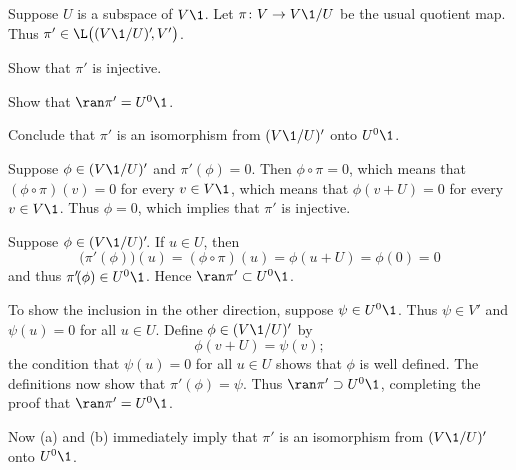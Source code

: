 \exercise
Suppose $U$ is a subspace of $V\1$. Let $\pi \colon V \to V\1/U$ be the usual quotient map. Thus $\pi' \in \L\bigl((V\1/U)'\!, V'\bigr)$.
\begin{subtheorem}
\item
Show that $\pi'$ is injective.
\item
Show that $\ran \pi' = U^0\1$.
\item
Conclude that $\pi'$ is an isomorphism from $(V\1/U)'$ onto $U^0\1$.
\end{subtheorem}

\begin{Solution}
\begin{subtheorem}
\item
Suppose $\phi \in (V\1/U)'$ and $\pi' \! (\phi) = 0$. Then $\phi \circ \pi = 0$, which means that $(\phi \circ \pi)(v) = 0$ for every $v\in V\1$, which means that $\phi(v + U) = 0$ for every $v \in V\1$. Thus $\phi = 0$, which implies that $\pi'$ is injective.

\item
Suppose $\phi \in (V\1/U)'\!$. If $u \in U$, then
\[
\bigl( \pi' \! (\phi) \bigr)(u) = (\phi \circ \pi)(u) = \phi( u + U) = \phi(0) = 0
\]
and thus $\pi' \! (\phi) \in U^0\1$. Hence $\ran \pi' \subset U^0\1$.

To show the inclusion in the other direction, suppose $\psi \in U^0\1$. Thus $\psi \in V'$ and $\psi(u) = 0$ for all $u \in U$. Define $\phi \in (V\1/U)'$ by
\[
\phi(v+ U) = \psi(v);
\]
the condition that $\psi(u) = 0$ for all $u \in U$ shows that $\phi$ is well defined. The definitions now show that $\pi' \! (\phi) = \psi$. Thus $\ran \pi' \supset U^0\1$, completing the proof that $\ran \pi' = U^0\1$.

\item
Now (a) and (b) immediately imply that $\pi'$ is an isomorphism from $(V\1/U)'$ onto $U^0\1$.
\end{subtheorem}
\end{Solution}

